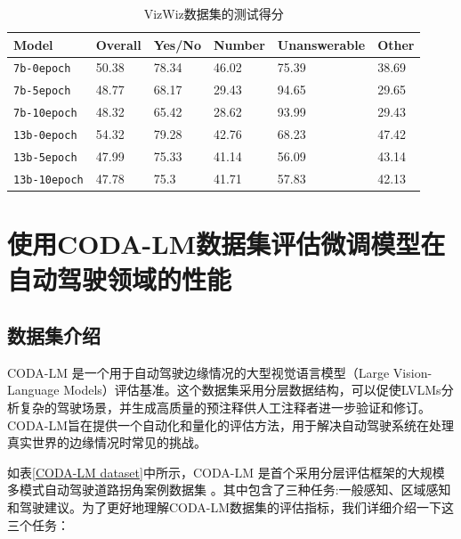 \documentclass[
    linespread = 1.25
]{ctexart}
\begin{document}
\begin{table}[hbt]
  \centering
  \caption{VizWiz数据集的测试得分}
  \label{tab:vizwiz}
  \begin{tabular}{@{}llllll@{}}
  \toprule
  Model            & Overall & Yes/No & Number & Unanswerable & Other \\ \midrule
  \texttt{7b-0epoch}   & 50.38   & 78.34  & 46.02  & 75.39        & 38.69 \\
  \texttt{7b-5epoch}   & 48.77   & 68.17  & 29.43  & 94.65        & 29.65 \\
  \texttt{7b-10epoch}  & 48.32   & 65.42  & 28.62  & 93.99        & 29.43 \\
  \texttt{13b-0epoch}  & 54.32   & 79.28  & 42.76  & 68.23        & 47.42 \\
  \texttt{13b-5epoch}  & 47.99   & 75.33  & 41.14  & 56.09        & 43.14 \\
  \texttt{13b-10epoch} & 47.78   & 75.3   & 41.71  & 57.83        & 42.13 \\ \bottomrule
  \end{tabular}
\end{table}

\section{使用CODA-LM数据集评估微调模型在自动驾驶领域的性能}
\subsection{数据集介绍}
CODA-LM 是一个用于自动驾驶边缘情况的大型视觉语言模型（Large Vision-Language Models）评估基准。这个数据集采用分层数据结构，可以促使LVLMs分析复杂的驾驶场景，并生成高质量的预注释供人工注释者进一步验证和修订。CODA-LM旨在提供一个自动化和量化的评估方法，用于解决自动驾驶系统在处理真实世界的边缘情况时常见的挑战。

如表\ref{CODA-LM dataset}中所示，CODA-LM 是首个采用分层评估框架的大规模多模式自动驾驶道路拐角案例数据集 \cite{chen2024automatedevaluationlargevisionlanguage}。其中包含了三种任务:一般感知、区域感知和驾驶建议。为了更好地理解CODA-LM数据集的评估指标，我们详细介绍一下这三个任务：
\end{document}
